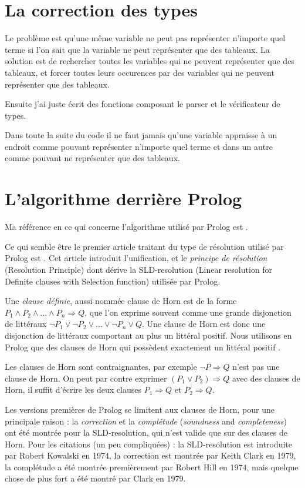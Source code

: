 \documentclass{article}
\begin{document}
\section{La correction des types}

Le problème est qu'une même variable ne peut pas représenter n'importe quel terme si l'on sait que la variable ne peut représenter que des tableaux. La solution est de rechercher toutes les variables qui ne peuvent représenter que des tableaux, et forcer toutes leurs occurences par des variables qui ne peuvent représenter que des tableaux.

Ensuite j'ai juste écrit des fonctions composant le parser et le vérificateur de types.

Dans toute la suite du code il ne faut jamais qu'une variable appraisse à un endroit comme pouvant représenter n'importe quel terme et dans un autre comme pouvant ne représenter que des tableaux.

\section{L'algorithme derrière Prolog}

Ma référence en ce qui concerne l'algorithme utilisé par Prolog est \cite{NilssonMaluszynski}.

Ce qui semble être le premier article traitant du type de résolution utilisé par Prolog est \cite{Robinson}. Cet article introduit l'unification, et le \emph{principe de résolution} (Resolution Principle) dont dérive la SLD-resolution (Linear resolution for Definite clauses with Selection function) utilisée par Prolog.

Une \emph{clause définie}, aussi nommée clause de Horn est de la forme \(P_1 \land P_2 \land ... \land P_n \Rightarrow Q\), que l'on exprime souvent comme une grande disjonction de littéraux \(\neg P_1 \lor \neg P_2 \lor ... \lor \neg P_n \lor Q\). Une clause de Horn est donc une disjonction de littéraux comportant au plus un littéral positif. Nous utilisons en Prolog que des clauses de Horn qui possèdent exactement un littéral positif .

Les clauses de Horn sont contraignantes, par exemple \(\neg P \Rightarrow Q\) n'est pas une clause de Horn. On peut par contre exprimer \((P_1 \lor P_2) \Rightarrow Q\) avec des clauses de Horn, il suffit d'écrire les deux clauses \(P_1 \Rightarrow Q\) et \(P_2 \Rightarrow Q\).

Les versions premières de Prolog se limitent aux clauses de Horn, pour une principale raison : la \emph{correction} et la \emph{complétude} (\emph{soundness} and \emph{completeness}) ont été montrée pour la SLD-resolution, qui n'est valide que sur des clauses de Horn. Pour les citations (un peu compliquées) : la SLD-resolution est introduite par Robert Kowalski en 1974, la correction est montrée par Keith Clark en 1979, la complétude a été montrée premièrement par Robert Hill en 1974, mais quelque chose de plus fort a été montré par Clark en 1979.
\end{document}
